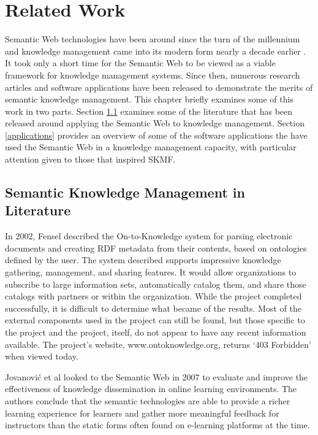 \chapter{Related Work}
 
Semantic Web technologies have been around since the turn of the millennium and knowledge management came into its modern form nearly a decade earlier
\cite{japanesekm}.
It took only a short time for the Semantic Web to be viewed as a viable framework for knowledge management systems. Since then, numerous research articles and software applications have been released to demonstrate the merits of semantic knowledge management. This chapter briefly examines some of this work in two parts. Section
\ref{research}
examines some of the literature that has been released around applying the Semantic Web to knowledge management. Section
\ref{applications}
provides an overview of some of the software applications the have used the Semantic Web in a knowledge management capacity, with particular attention given to those that inspired SKMF.

 
\section{Semantic Knowledge Management in Literature}
\label{research}

In 2002, Fensel described the On-to-Knowledge
\cite{ontoknow}
system for parsing electronic documents and creating RDF metadata from their contents, based on ontologies defined by the user. The system described supports impressive knowledge gathering, management, and sharing features. It would allow organizations to subscribe to large information sets, automatically catalog them, and share those catalogs with partners or within the organization. While the project completed successfully, it is difficult to determine what became of the results. Most of the external components used in the project can still be found, but those specific to the project and the project, itself, do not appear to have any recent information available. The project's website, www.ontoknowledge.org, returns `403 Forbidden' when viewed today.

Jovanović et al
\cite{semanticlearning}
looked to the Semantic Web in 2007 to evaluate and improve the effectiveness of knowledge dissemination in online learning environments. The authors conclude that the semantic technologies are able to provide a richer learning experience for learners and gather more meaningful feedback for instructors than the static forms often found on e-learning platforms at the time.

